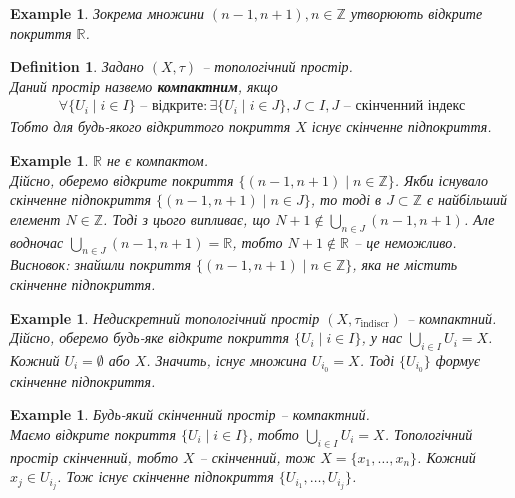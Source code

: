 \documentclass[a4paper, 10pt]{article}
\theoremstyle{theoremdd}
\newtheorem{definition}[theorem]{Definition}
\newtheorem{example}[theorem]{Example}
\begin{document}
\begin{example}
Зокрема множини $(n-1,n+1), n \in \mathbb{Z}$ утворюють відкрите покриття $\mathbb{R}$.
\end{example}

\begin{definition}
Задано $(X,\tau)$ -- топологічний простір.\\
Даний простір назвемо \textbf{компактним}, якщо
\begin{align*}
\forall \{ U_i \mid i \in I \} \text{ -- відкрите}: \exists \{U_i \mid i \in J\}, J \subset I, J \text{ -- скінченний індекс}
\end{align*}
Тобто для будь-якого відкриттого покриття $X$ існує скінченне підпокриття.
\end{definition}

\begin{example}
$\mathbb{R}$ не є компактом.\\
Дійсно, оберемо відкрите покриття $\{(n-1,n+1) \mid n \in \mathbb{Z}\}$. Якби існувало скінченне підпокриття $\{(n-1,n+1) \mid n \in J\}$, то тоді в $J \subset \mathbb{Z}$ є найбільший елемент $N \in \mathbb{Z}$. Тоді з цього випливає, що $N+1 \notin \displaystyle\bigcup_{n \in J} (n-1,n+1)$. Але водночас $\displaystyle\bigcup_{n \in J} (n-1,n+1) = \mathbb{R}$, тобто $N+1 \notin \mathbb{R}$ -- це неможливо.\\
Висновок: знайшли покриття $\{(n-1,n+1) \mid n \in \mathbb{Z}\}$, яка не містить скінченне підпокриття.
\end{example}

\begin{example}
Недискретний топологічний простір $(X,\tau_{\text{indiscr}})$ -- компактний.\\
Дійсно, оберемо будь-яке відкрите покриття $\{U_i \mid i \in I\}$, у нас $\displaystyle\bigcup_{i \in I} U_i = X$. Кожний $U_i = \emptyset$ або $X$. Значить, існує множина $U_{i_0} = X$. Тоді $\{U_{i_0}\}$ формує скінченне підпокриття.
\end{example}

\begin{example}
\label{finite_is_compact}
Будь-який скінченний простір -- компактний.\\
Маємо відкрите покриття $\{U_i \mid i \in I\}$, тобто $\displaystyle\bigcup_{i \in I} U_i = X$. Топологічний простір скінченний, тобто $X$ -- скінченний, тож $X = \{x_1,\dots,x_n\}$. Кожний $x_j \in U_{i_j}$. Тож існує скінченне підпокриття $\{U_{i_1},\dots,U_{i_j}\}$.
\end{example}
\end{document}
